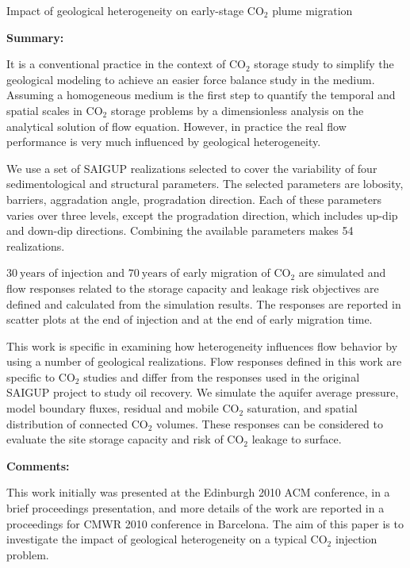 %
%
{Impact of geological heterogeneity on early-stage $\mbox{CO}_2$ plume
migration}
{%
\textbf{Summary:}

It is a conventional practice in the context of $\mbox{CO}_2$ storage study to
simplify the geological modeling to achieve an easier force balance
study in the medium. Assuming a homogeneous medium is the first step to quantify
the temporal and spatial scales in $\mbox{CO}_2$ storage problems by a
dimensionless analysis on the analytical solution of flow equation. However, in
practice the real flow performance is very much influenced by geological
heterogeneity. 

We use a set of SAIGUP realizations selected to cover the variability of four
sedimentological and structural parameters. The selected parameters are
lobosity, barriers, aggradation angle, progradation direction. Each
of these parameters varies over three levels, except the progradation direction,
which includes up-dip and down-dip directions. Combining the available 
parameters makes 54 realizations.

$30~\mbox{years}$ of injection and $70~\mbox{years}$ of early migration of
$\mbox{CO}_2$ are simulated and flow responses related to the storage
capacity and leakage risk objectives are defined and calculated from
the simulation results. The responses are reported in scatter plots at the end of
injection and at the end of early migration time. 

This work is specific in examining how heterogeneity influences flow behavior
by using a number of geological realizations. Flow responses defined in
this work are specific to $\mbox{CO}_2$ studies and differ from the responses
used in the original SAIGUP project to study oil recovery. We simulate the
aquifer average pressure,  model boundary fluxes, residual and mobile CO$_2$
saturation, and spatial distribution of connected CO$_2$ volumes. These
responses can be considered to evaluate the site storage capacity and risk of
CO$_2$ leakage to surface. 

\vspace{0.5cm}
\noindent\textbf{Comments:}

This work initially was presented at the  Edinburgh 2010 ACM conference, in a
brief proceedings presentation, and more details of the work are reported in a
proceedings for CMWR 2010 conference in Barcelona. The aim of this paper is to
investigate the impact of geological heterogeneity on a typical $\mbox{CO}_2$
injection problem.

}
